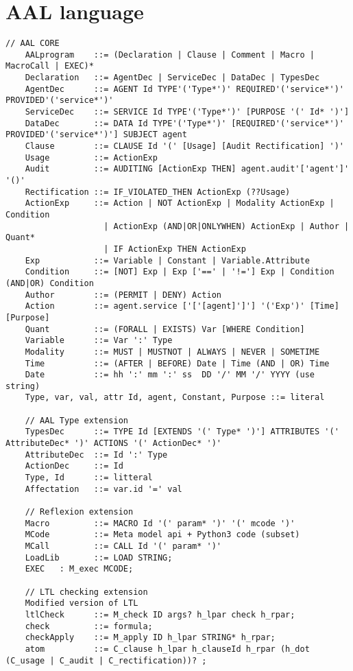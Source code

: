 \section{AAL language}
\begin{lstlisting}[caption={AAL Syntax}, label=syntax]
    // AAL CORE
    AALprogram    ::= (Declaration | Clause | Comment | Macro | MacroCall | EXEC)*
    Declaration   ::= AgentDec | ServiceDec | DataDec | TypesDec
    AgentDec      ::= AGENT Id TYPE'('Type*')' REQUIRED'('service*')' PROVIDED'('service*')'
    ServiceDec    ::= SERVICE Id TYPE'('Type*')' [PURPOSE '(' Id* ')']
    DataDec       ::= DATA Id TYPE'('Type*')' [REQUIRED'('service*')' PROVIDED'('service*')'] SUBJECT agent
    Clause        ::= CLAUSE Id '(' [Usage] [Audit Rectification] ')'
    Usage         ::= ActionExp
    Audit         ::= AUDITING [ActionExp THEN] agent.audit'['agent']' '()'
    Rectification ::= IF_VIOLATED_THEN ActionExp (??Usage)
    ActionExp     ::= Action | NOT ActionExp | Modality ActionExp | Condition 
                    | ActionExp (AND|OR|ONLYWHEN) ActionExp | Author | Quant*
                    | IF ActionExp THEN ActionExp
    Exp           ::= Variable | Constant | Variable.Attribute
    Condition     ::= [NOT] Exp | Exp ['==' | '!='] Exp | Condition (AND|OR) Condition 
    Author        ::= (PERMIT | DENY) Action
    Action        ::= agent.service ['['[agent]']'] '('Exp')' [Time] [Purpose]
    Quant         ::= (FORALL | EXISTS) Var [WHERE Condition]
    Variable      ::= Var ':' Type
    Modality      ::= MUST | MUSTNOT | ALWAYS | NEVER | SOMETIME
    Time          ::= (AFTER | BEFORE) Date | Time (AND | OR) Time
    Date          ::= hh ':' mm ':' ss  DD '/' MM '/' YYYY (use string)
    Type, var, val, attr Id, agent, Constant, Purpose ::= literal

    // AAL Type extension
    TypesDec      ::= TYPE Id [EXTENDS '(' Type* ')'] ATTRIBUTES '(' AttributeDec* ')' ACTIONS '(' ActionDec* ')'
    AttributeDec  ::= Id ':' Type
    ActionDec     ::= Id
    Type, Id      ::= litteral
    Affectation   ::= var.id '=' val

    // Reflexion extension
    Macro         ::= MACRO Id '(' param* ')' '(' mcode ')'
    MCode         ::= Meta model api + Python3 code (subset)
    MCall         ::= CALL Id '(' param* ')'
    LoadLib       ::= LOAD STRING;
    EXEC   : M_exec MCODE;

    // LTL checking extension
    Modified version of LTL
    ltlCheck      ::= M_check ID args? h_lpar check h_rpar;
    check         ::= formula;
    checkApply    ::= M_apply ID h_lpar STRING* h_rpar;
    atom          ::= C_clause h_lpar h_clauseId h_rpar (h_dot (C_usage | C_audit | C_rectification))? ;

\end{lstlisting}